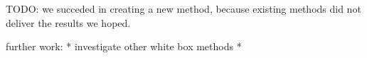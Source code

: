 TODO: we succeded in creating a new method, because existing methods did not deliver the results we hoped.

further work:
* investigate other white box methods
* 
